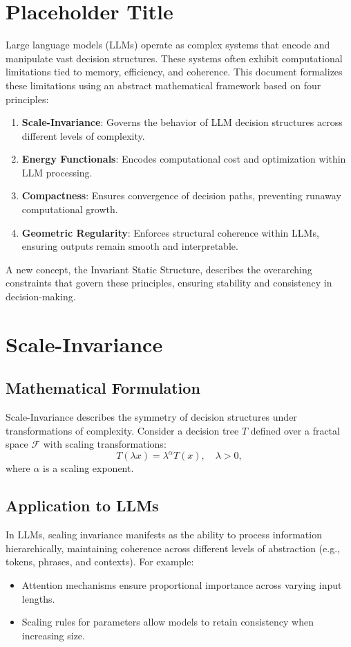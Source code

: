 \section{Placeholder Title}
Large language models (LLMs) operate as complex systems that encode and manipulate vast decision structures. These systems often exhibit computational limitations tied to memory, efficiency, and coherence. This document formalizes these limitations using an abstract mathematical framework based on four principles:

\begin{enumerate}
    \item \textbf{Scale-Invariance}: Governs the behavior of LLM decision structures across different levels of complexity.
    \item \textbf{Energy Functionals}: Encodes computational cost and optimization within LLM processing.
    \item \textbf{Compactness}: Ensures convergence of decision paths, preventing runaway computational growth.
    \item \textbf{Geometric Regularity}: Enforces structural coherence within LLMs, ensuring outputs remain smooth and interpretable.
\end{enumerate}

A new concept, the Invariant Static Structure, describes the overarching constraints that govern these principles, ensuring stability and consistency in decision-making.

\section{Scale-Invariance}

\subsection{Mathematical Formulation}
Scale-Invariance describes the symmetry of decision structures under transformations of complexity. Consider a decision tree $T$ defined over a fractal space $\mathcal{F}$ with scaling transformations:
\begin{equation}
T(\lambda x) = \lambda^\alpha T(x), \quad \lambda > 0,
\end{equation}
where $\alpha$ is a scaling exponent.

\subsection{Application to LLMs}
In LLMs, scaling invariance manifests as the ability to process information hierarchically, maintaining coherence across different levels of abstraction (e.g., tokens, phrases, and contexts). For example:
\begin{itemize}
    \item Attention mechanisms ensure proportional importance across varying input lengths.
    \item Scaling rules for parameters allow models to retain consistency when increasing size.
\end{itemize}

